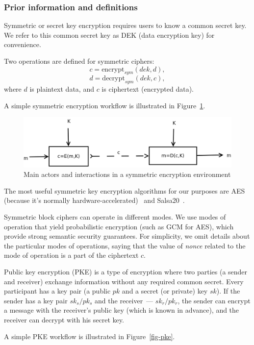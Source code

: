 \documentclass[notitlepage,longbibliography]{revtex4-1}
\begin{document}
\subsubsection{Prior information and definitions}

Symmetric or secret key encryption requires users to know a common secret key.
We refer to this common secret key as DEK (data encryption key) for convenience.

Two operations are defined for symmetric ciphers:
$$c = \text{encrypt}_{sym}(dek, d),$$
$$d = \text{decrypt}_{sym}(dek, c),$$
where $d$ is plaintext data, and $c$ is ciphertext (encrypted data).

A simple symmetric encryption workflow is illustrated in Figure~\ref{fig-symmetric}.

\begin{figure}
\centering
\includegraphics[width=\columnwidth]{symmetric.png}
\caption{Main actors and interactions in a symmetric encryption environment}\label{fig-symmetric}
\end{figure}

The most useful symmetric key encryption algorithms for our purposes are AES (because it's normally hardware-accelerated)~\cite{wiki:aes}
and Salsa20~\cite{wiki:salsa20}.

Symmetric block ciphers can operate in different modes.
We use modes of operation that yield probabilistic encryption (such as GCM for AES), which provide strong semantic security guarantees.
For simplicity, we omit details about the particular modes of operations, saying that the value of \emph{nonce} related to the mode of operation is a part of the
ciphertext $c$.

Public key encryption (PKE) is a type of encryption where two parties (a sender and receiver) exchange information without any required common secret.
Every participant has a key pair (a public $pk$ and a secret (or private) key $sk$).
If the sender has a key pair $sk_s/pk_s$ and the receiver~--- $sk_r/pk_r$, the sender can encrypt a message with the receiver's public key (which is known in advance),
and the receiver can decrypt with his secret key.

A simple PKE workflow is illustrated in Figure~\ref{fig-pke}.
\end{document}
